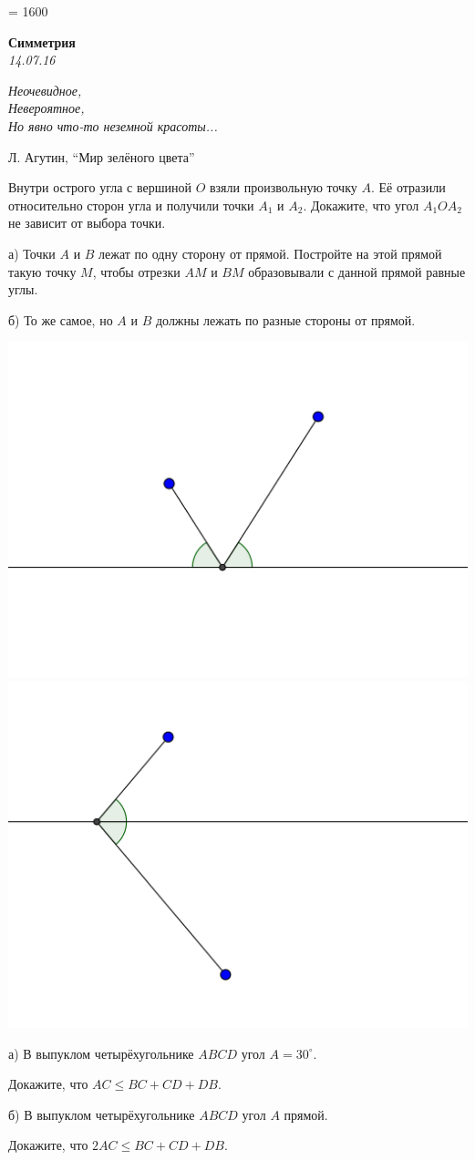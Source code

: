 \tolerance = 1600

\begin{center}
\textbf{\Large Симметрия}\\
\textit{14.07.16}
\end{center}

\epigraph{\it Неочевидное, \\ Невероятное, \\ Но явно что-то неземной красоты...}{Л. Агутин, ``Мир зелёного цвета''}

\begin{problems}
\item Внутри острого угла с вершиной $O$ взяли произвольную точку $A$. Её отразили относительно сторон угла и получили точки $A_1$ и $A_2$. Докажите, что угол $A_1OA_2$ не зависит от выбора точки.

\item а) Точки $A$ и $B$ лежат по одну сторону от прямой. Постройте на этой прямой такую точку $M$, чтобы отрезки $AM$ и $BM$ образовывали с данной прямой равные углы.

б) То же самое, но $A$ и $B$ должны лежать по разные стороны от прямой.

\begin{center}
\includegraphics[width=.35\textwidth]{simm01}
\includegraphics[width=.35\textwidth]{simm02}
\end{center}

\item а) В выпуклом четырёхугольнике $ABCD$ угол $A = 30^\circ$.

Докажите, что ${AC \leqslant BC + CD + DB}$.

б) В выпуклом четырёхугольнике $ABCD$ угол $A$ прямой.

Докажите, что ${2AC \leqslant BC + CD + DB}$.


\end{problems}
